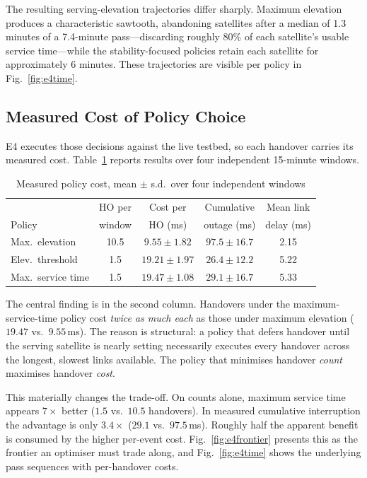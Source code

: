\documentclass[conference]{IEEEtran}
\begin{document}
The resulting serving-elevation trajectories differ sharply. Maximum elevation
produces a characteristic sawtooth, abandoning satellites after a median of
1.3 minutes of a 7.4-minute pass---discarding roughly 80\% of each satellite's
usable service time---while the stability-focused policies retain each satellite
for approximately 6 minutes. These trajectories are visible per policy in
Fig.~\ref{fig:e4time}.

\subsection{Measured Cost of Policy Choice}
\label{sec:e4}

E4 executes those decisions against the live testbed, so each handover carries
its measured cost. Table~\ref{tab:e4} reports results over four independent
15-minute windows.

\begin{table}[t]
\caption{Measured policy cost, mean $\pm$ s.d.\ over four independent windows}
\label{tab:e4}
\centering
\begin{tabular}{lcccc}
\toprule
 & HO per & Cost per & Cumulative & Mean link \\
Policy & window & HO (ms) & outage (ms) & delay (ms) \\
\midrule
Max.\ elevation & 10.5 & $9.55 \pm 1.82$ & $97.5 \pm 16.7$ & 2.15 \\
Elev.\ threshold & 1.5 & $19.21 \pm 1.97$ & $26.4 \pm 12.2$ & 5.22 \\
Max.\ service time & 1.5 & $19.47 \pm 1.08$ & $29.1 \pm 16.7$ & 5.33 \\
\bottomrule
\end{tabular}
\end{table}

The central finding is in the second column. Handovers under the
maximum-service-time policy cost \emph{twice as much each} as those under
maximum elevation ($19.47$ vs.\ $9.55$\,ms). The reason is structural: a
policy that defers handover until the serving satellite is nearly setting
necessarily executes every handover across the longest, slowest links available.
The policy that minimises handover \emph{count} maximises handover \emph{cost}.

This materially changes the trade-off. On counts alone, maximum service time
appears $7\times$ better ($1.5$ vs.\ $10.5$ handovers). In measured cumulative
interruption the advantage is only $3.4\times$ ($29.1$ vs.\ $97.5$\,ms). Roughly
half the apparent benefit is consumed by the higher per-event cost.
Fig.~\ref{fig:e4frontier} presents this as the frontier an optimiser must trade
along, and Fig.~\ref{fig:e4time} shows the underlying pass sequences with
per-handover costs.
\end{document}
